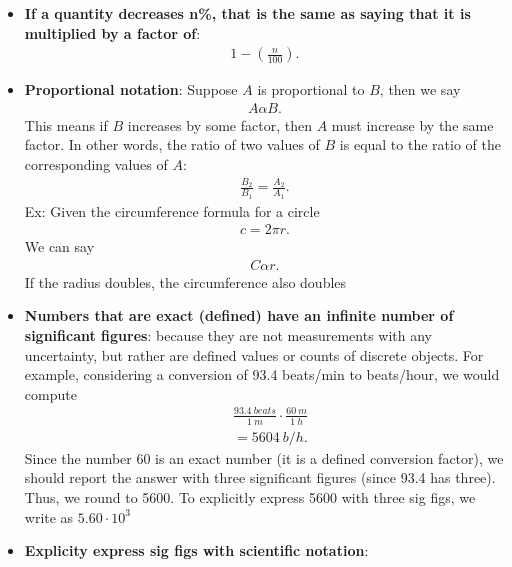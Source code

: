 \documentclass{report}
\begin{document}
\begin{itemize}
        \item \textbf{If a quantity decreases n\%, that is the same as saying that it is multiplied by a factor of}:
            \begin{align*}
                1 - \left(\frac{n}{100}\right)
            .\end{align*}
        \item \textbf{Proportional notation}: Suppose $A$ is proportional to $B$, then we say
            \begin{align*}
               A \alpha B 
            .\end{align*}
            This means if $B$ increases by some factor, then $A$ must increase by the same factor.
            \bigbreak \noindent 
            In other words, the ratio of two values of $B$ is equal to the ratio of the corresponding values of $A$:
            \begin{align*}
                \frac{B_{2}}{B_{1}} = \frac{A_{2}}{A_{1}}
            .\end{align*}
            \bigbreak \noindent 
            Ex: Given the circumference formula for a circle
            \begin{align*}
               c =2\pi r
            .\end{align*}
            We can say
            \begin{align*}
                C \alpha r
            .\end{align*}
            If the radius doubles, the circumference also doubles
        \item \textbf{Numbers that are exact (defined) have an infinite number of significant figures}: because they are not measurements with any uncertainty, but rather are defined values or counts of discrete objects. For example, considering a conversion of 93.4 beats/min to beats/hour, we would compute
            \begin{align*}
            &\frac{93.4\ beats}{1\ m} \cdot \frac{60\ m}{1\ h} \\
            &=5604\ b/h
            .\end{align*}
            Since the number 60 is an exact number (it is a defined conversion factor), we should report the answer with three significant figures (since 93.4 has three). Thus, we round to 5600. To explicitly express 5600 with three sig figs, we write as $5.60 \cdot 10^{3} $
        \item \textbf{Explicity express sig figs with scientific notation}:
            \begin{align*}

\end{align*}
\end{itemize}
\end{document}
